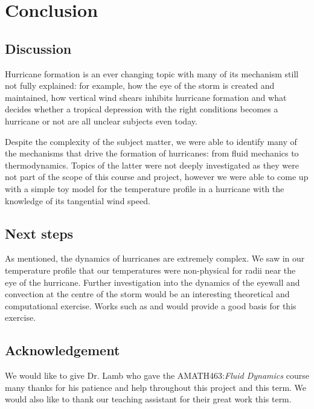 \chapter{Conclusion}
\section{Discussion}
Hurricane formation is an ever changing topic with many of its mechanism still not fully explained: for example, how the eye of the storm is created and maintained, how vertical wind shears inhibits hurricane formation and what decides whether a tropical depression with the right conditions becomes a hurricane or not are all unclear subjects even today.

Despite the complexity of the subject matter, we were able to identify many of the mechanisms that drive the formation of hurricanes: from fluid mechanics to thermodynamics. Topics of the latter were not deeply investigated as they were not part of the scope of this course and project, however we were able to come up with a simple toy model for the temperature profile in a hurricane with the knowledge of its tangential wind speed. 

\section{Next steps}
As mentioned, the dynamics of hurricanes are extremely complex. We saw in our temperature profile that our temperatures were non-physical for radii near the eye of the hurricane. Further investigation into the dynamics of the eyewall and convection at the centre of the storm would be an interesting theoretical and computational exercise. Works such as \cite{smith_montgomery_2017} and \cite{Ooyama1969} would provide a good basis for this exercise.

\section{Acknowledgement}
We would like to give Dr. Lamb who gave the AMATH463:\textit{Fluid Dynamics} course many thanks for his patience and help throughout this project and this term. We would also like to thank our teaching assistant for their great work this term.
